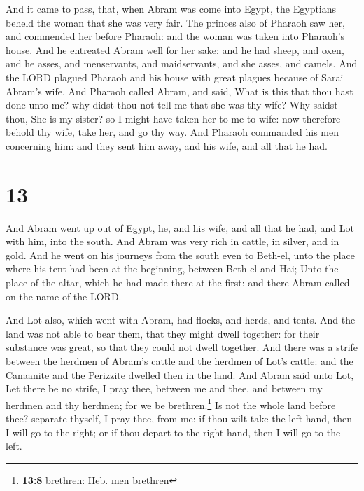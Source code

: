  And it came to pass, that, when Abram was come into
Egypt, the Egyptians beheld the woman that she was very fair.
 The princes also of Pharaoh saw her, and commended her
before Pharaoh: and the woman was taken into Pharaoh's house.
 And he entreated Abram well for her sake: and he had
sheep, and oxen, and he asses, and menservants, and maidservants, and
she asses, and camels.  And the LORD plagued Pharaoh and
his house with great plagues because of Sarai Abram's wife.
 And Pharaoh called Abram, and said, What is this that
thou hast done unto me? why didst thou not tell me that she was thy
wife?  Why saidst thou, She is my sister? so I might have
taken her to me to wife: now therefore behold thy wife, take her, and go
thy way.  And Pharaoh commanded his men concerning him:
and they sent him away, and his wife, and all that he had.

\hypertarget{section-12}{%
\section{13}\label{section-12}}

 And Abram went up out of Egypt, he, and his wife, and all
that he had, and Lot with him, into the south.  And Abram
was very rich in cattle, in silver, and in gold.  And he
went on his journeys from the south even to Beth-el, unto the place
where his tent had been at the beginning, between Beth-el and Hai;
 Unto the place of the altar, which he had made there at
the first: and there Abram called on the name of the LORD.

 And Lot also, which went with Abram, had flocks, and
herds, and tents.  And the land was not able to bear them,
that they might dwell together: for their substance was great, so that
they could not dwell together.  And there was a strife
between the herdmen of Abram's cattle and the herdmen of Lot's cattle:
and the Canaanite and the Perizzite dwelled then in the land.
 And Abram said unto Lot, Let there be no strife, I pray
thee, between me and thee, and between my herdmen and thy herdmen; for
we be brethren.\footnote{\textbf{13:8} brethren: Heb. men brethren}
 Is not the whole land before thee? separate thyself, I
pray thee, from me: if thou wilt take the left hand, then I will go to
the right; or if thou depart to the right hand, then I will go to the
left.

